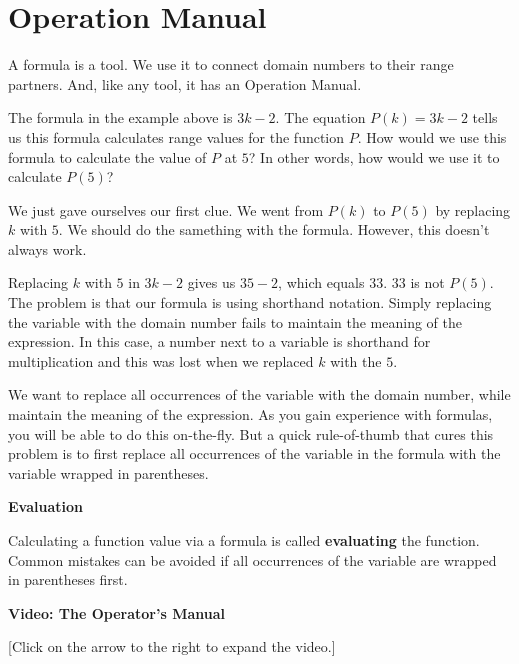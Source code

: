 \documentclass{ximera}
\begin{document}
\section{Operation Manual}

A formula is a tool.  We use it to connect domain numbers to their range partners.  And, like any tool, it has an Operation Manual.



The formula in the example above is $3k - 2$.  The equation $P(k) = 3k - 2$ tells us this formula calculates range values for the function $P$.  How would we use this formula to calculate the value of $P$ at $5$?   In other words, how would we use it to calculate $P(5)$?

We just gave ourselves our first clue. We went from $P(k)$ to $P(5)$ by replacing $k$ with $5$.  We should do the samething with the formula. However, this doesn't always work.






Replacing $k$ with $5$ in $3k - 2$ gives us $35-2$, which equals $33$.  $33$ is not $P(5)$. The problem is that our formula is using shorthand notation. Simply replacing the variable with the domain number fails to maintain the meaning of the expression.  In this case, a number next to a variable is shorthand for multiplication and this was lost when we replaced $k$ with the $5$.

We want to replace all occurrences of the variable with the domain number, while maintain the meaning of the expression.  As you gain experience with formulas, you will be able to do this on-the-fly.  But a quick rule-of-thumb that cures this problem is to first replace all occurrences of the variable in the formula with the variable wrapped in parentheses.


\begin{procedure} \textbf{\textcolor{purple!85!blue}{Evaluation}}   

Calculating a function value via a formula is called \textbf{evaluating} the function.  Common mistakes can be avoided if all occurrences of the variable are wrapped in parentheses first.
\end{procedure}








\begin{explanation} \textbf{Video: The Operator's Manual}

[Click on the arrow to the right to expand the video.]
\begin{expandable} 

\begin{center}
\end{center}

\end{expandable}
\end{explanation}
\end{document}
